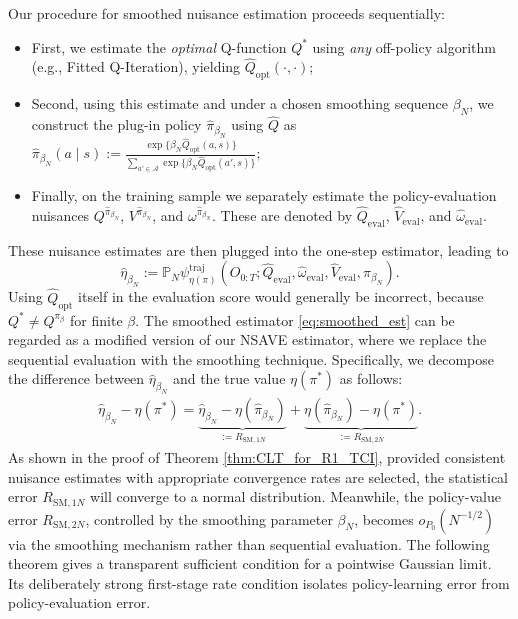 \documentclass[12pt]{article}
\theoremstyle{remark}\newtheorem{remark}[theorem]{Remark}\theoremstyle{plain}
\newcommand{\EstFunTraj}{{\psi}^{\text{traj}}}
\newcommand{\pn}{\mathbb{P}_N}
\begin{document}
Our procedure for smoothed nuisance estimation proceeds sequentially:
\begin{itemize}
    \item First, we estimate the \textit{optimal} Q-function $Q^*$ using \textit{any} off-policy algorithm (e.g., Fitted Q-Iteration), yielding $\widehat{Q}_{\text{opt}}(\cdot, \cdot)$;
    \item Second, using this estimate and under a chosen smoothing sequence $\beta_N$, we construct the plug-in policy $\widehat{\pi}_{\beta_N}$ using $\widehat{Q}$ as
    $
        \widehat{\pi}_{\beta_N}(a \mid s) := \frac{\exp\{\beta_N \widehat{Q}_{\text{opt}}(a, s)\}}{\sum_{a' \in \mathcal{A}} \exp\{\beta_N \widehat{Q}_{\text{opt}}(a', s)\}};
    $
    \item Finally, on the training sample we separately estimate the
    policy-evaluation nuisances
    $Q^{\widehat\pi_{\beta_N}}$,
    $V^{\widehat\pi_{\beta_N}}$, and
    $\omega^{\widehat\pi_{\beta_N}}$.  These are denoted by
    $\widehat Q_{\mathrm{eval}}$,
    $\widehat V_{\mathrm{eval}}$, and
    $\widehat\omega_{\mathrm{eval}}$.
\end{itemize}
These nuisance estimates are then plugged into the one-step estimator, leading to
\begin{equation}\label{eq:smoothed_est}
    \widehat{\eta}_{\beta_N}
    :=
    \pn\EstFunTraj_{\eta(\pi)}
    (O_{0:T};
    \widehat Q_{\mathrm{eval}},
    \widehat\omega_{\mathrm{eval}},
    \widehat V_{\mathrm{eval}},
    \widehat\pi_{\beta_N}).
\end{equation}
Using $\widehat Q_{\mathrm{opt}}$ itself in the evaluation score would
generally be incorrect, because
$Q^*\neq Q^{\pi_\beta}$ for finite $\beta$.
The smoothed estimator \eqref{eq:smoothed_est} can be regarded as a modified version of our NSAVE estimator, where we replace the sequential evaluation with the smoothing technique. Specifically, we decompose the difference between $\widehat{\eta}_{\beta_N}$ and the true value $\eta(\pi^*)$ as follows:
\[
    \begin{aligned}
        \widehat{\eta}_{\beta_N} - \eta(\pi^*) = \underbrace{\widehat{\eta}_{\beta_N} - \eta(\widehat\pi_{\beta_N})}_{:= R_{\text{SM}, 1N}} + \underbrace{\eta(\widehat\pi_{\beta_N}) - \eta(\pi^*)}_{:= R_{\text{SM}, 2N}}.
    \end{aligned}
\]
As shown in the proof of Theorem \ref{thm:CLT_for_R1_TCI}, provided consistent nuisance estimates with appropriate convergence rates are selected, the statistical error $R_{\text{SM}, 1N}$ will converge to a normal distribution. Meanwhile, the policy-value error $R_{\text{SM}, 2N}$, controlled by the smoothing parameter $\beta_N$, becomes $o_{P_0}(N^{-1 / 2})$ via the smoothing mechanism rather than sequential evaluation.
The following theorem gives a transparent sufficient condition for a
pointwise Gaussian limit.  Its deliberately strong first-stage rate
condition isolates policy-learning error from policy-evaluation error.
\end{document}
